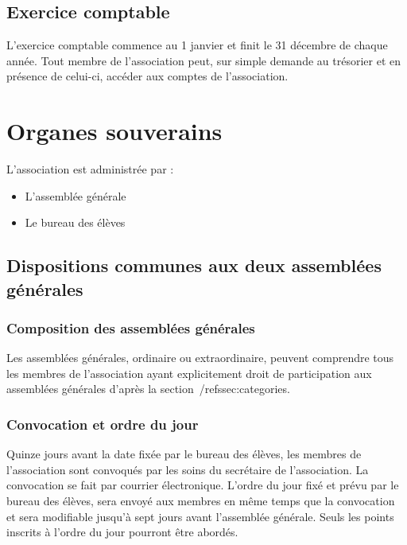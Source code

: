 \documentclass{article}
\begin{document}
		\subsection{Exercice comptable}
			L’exercice comptable commence au 1 janvier et finit le 31
			décembre de chaque année. Tout membre de l’association peut, sur
			simple demande au trésorier et en présence de celui-ci, accéder aux
			comptes de l’association.

	\section{Organes souverains}
		L’association est administrée par :
		\begin{itemize}
			\item L’assemblée générale
			\item Le bureau des élèves
		\end{itemize}

		\subsection{Dispositions communes aux deux assemblées générales}
			\subsubsection{Composition des assemblées générales}
				Les assemblées générales, ordinaire ou extraordinaire, peuvent
				comprendre tous les membres de l’association ayant explicitement
				droit de participation aux assemblées générales d'après la
				section~/ref{ssec:categories}.

			\subsubsection{Convocation et ordre du jour}
			\label{sssec:convocation}
				Quinze jours avant la date fixée par le bureau des élèves, les
				membres de l’association sont convoqués par les soins du
				secrétaire de l’association. La convocation se fait par courrier
				électronique. L’ordre du jour fixé et prévu par le bureau des
				élèves, sera envoyé aux membres en même temps que la convocation
				et sera modifiable jusqu’à sept jours avant l'assemblée
				générale. Seuls les points inscrits à l’ordre du jour pourront
				être abordés.
				
\end{document}
